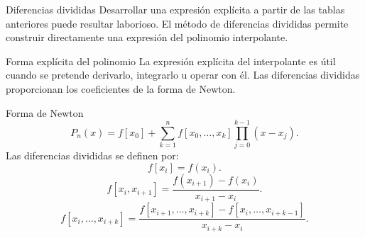 \documentclass[original_version/main.tex]{subfiles}
\begin{document}
\begin{frame}[t]{Diferencias divididas}
Desarrollar una expresión explícita a partir de las tablas anteriores puede resultar laborioso.
\bigskip
El método de diferencias divididas permite construir directamente una expresión del polinomio interpolante.
\end{frame}
\begin{frame}[t]{Forma explícita del polinomio}
La expresión explícita del interpolante es útil cuando se pretende derivarlo, integrarlo u operar con él.
\bigskip
Las diferencias divididas proporcionan los coeficientes de la forma de Newton.
\end{frame}
\begin{frame}[t]{Forma de Newton}
\small\[P_n(x)=f[x_0]+\sum_{k=1}^n f[x_0,\ldots,x_k]\prod_{j=0}^{k-1}(x-x_j).\]Las diferencias divididas se definen por:\[f[x_i]=f(x_i).\]\[f[x_i,x_{i+1}]=\frac{f(x_{i+1})-f(x_i)}{x_{i+1}-x_i}.\]\[f[x_i,\ldots,x_{i+k}]=\frac{f[x_{i+1},\ldots,x_{i+k}]-f[x_i,\ldots,x_{i+k-1}]}{x_{i+k}-x_i}.\]
\end{frame}
\end{document}
